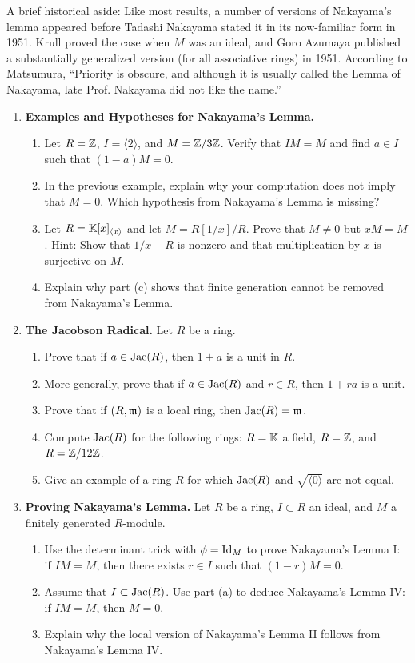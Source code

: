 \documentclass[Notebook.tex]{subfiles}
\begin{document}
A brief historical aside: Like most results, a number of versions of Nakayama's lemma appeared before Tadashi Nakayama stated it in its now-familiar form in  1951. Krull proved the case when $M$ was an ideal, and Goro Azumaya published a substantially generalized version (for all associative rings) in 1951. According to Matsumura, ``Priority is obscure, and although it is usually called the Lemma of Nakayama, late Prof. Nakayama did not like the name.''

\hrulefill

\begin{enumerate}[leftmargin=*, resume=problems]

\item \textbf{Examples and Hypotheses for Nakayama's Lemma.}
\begin{enumerate}
    \item Let $R=\mathbb Z$,  $I=\langle 2\rangle$, and  $M=\mathbb Z/3\mathbb Z$. Verify that $IM=M$ and find $a\in I$ such that $(1-a)M=0$.
    \item In the previous example, explain why your computation does not imply that $M=0$. Which hypothesis from Nakayama's Lemma is missing?
    \item Let $R=\mathbb K[x]_{\langle x\rangle}$ and let $M=R[1/x]/R$. Prove that $M\neq 0$ but $xM=M$. Hint: Show that $1/x+R$ is nonzero and that multiplication by $x$ is surjective on $M$.
    \item Explain why part (c) shows that finite generation cannot be removed from Nakayama's Lemma.
\end{enumerate}

\item \textbf{The Jacobson Radical.} Let $R$ be a ring.
\begin{enumerate}
    \item Prove that if $a\in \text{Jac}(R)$, then $1+a$ is a unit in $R$.
    \item More generally, prove that if $a\in \text{Jac}(R)$ and $r\in R$, then $1+ra$ is a unit.
    \item Prove that if $(R,\operatorname{\mathfrak{m}})$ is a local ring, then $\text{Jac}(R)=\operatorname{\mathfrak{m}}$.
    \item Compute $\text{Jac}(R)$ for the following rings: $R=\mathbb K$ a field, $R=\mathbb Z$, and $R=\mathbb Z/12\mathbb Z$.
        \item Give an example of a ring $R$ for which $\text{Jac}(R)$ and $\sqrt{\langle 0\rangle}$ are not equal.
\end{enumerate}

\item \textbf{Proving Nakayama's Lemma.} Let $R$ be a ring, $I\subset R$ an ideal, and $M$ a finitely generated $R$-module. 
\begin{enumerate}
    \item Use the determinant trick with $\phi=\operatorname{Id}_{M}$ to prove Nakayama's Lemma I: if $IM=M$, then there exists $r\in I$ such that $(1-r)M=0$.
    \item Assume that $I \subset \text{Jac}(R)$. Use part (a) to deduce Nakayama's Lemma IV: if $IM=M$, then $M=0$.
    \item Explain why the local version of Nakayama's Lemma II follows from Nakayama's Lemma IV.
\end{enumerate}


\end{enumerate}
\end{document}

